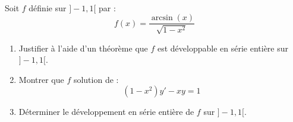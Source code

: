 \documentclass[a4paper,10pt]{report}
\begin{document}
\newpage

$\phantom{test}$

\vspace{7cm}
\begin{ApplicationDirecte}
Soit $f$ définie sur $]-1,1[$ par :
$$ f(x) = \dfrac{\arcsin(x)}{\sqrt{1-x^2}}$$
\begin{enumerate}
\item Justifier à l'aide d'un théorème que $f$ est développable en série entière sur $]-1,1[$.
\item Montrer que $f$ solution de :
$$ (1-x^2)y'-xy=1$$
\item Déterminer le développement en série entière de $f$ sur $]-1,1[$.
\end{enumerate}
\end{ApplicationDirecte}
\end{document}
